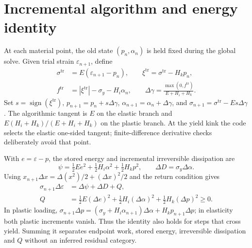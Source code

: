 \documentclass[11pt,a4paper]{article}
\begin{document}
\newpage
\section{Incremental algorithm and energy identity}
At each material point, the old state $(p_n,\alpha_n)$ is held fixed during the
global solve. Given trial strain $\varepsilon_{n+1}$, define
\begin{align}
 \sigma^{\mathrm{tr}}&=E(\varepsilon_{n+1}-p_n),\qquad
 \xi^{\mathrm{tr}}=\sigma^{\mathrm{tr}}-H_kp_n,\\
 f^{\mathrm{tr}}&=|\xi^{\mathrm{tr}}|-\sigma_y-H_i\alpha_n,\qquad
 \Delta\gamma=\frac{\max(0,f^{\mathrm{tr}})}{E+H_i+H_k}.\label{eq:return}
\end{align}
Set $s=\operatorname{sign}(\xi^{\mathrm{tr}})$, $p_{n+1}=p_n+s\Delta\gamma$,
$\alpha_{n+1}=\alpha_n+\Delta\gamma$, and
$\sigma_{n+1}=\sigma^{\mathrm{tr}}-Es\Delta\gamma$. The algorithmic tangent is $E$
on the elastic branch and $E(H_i+H_k)/(E+H_i+H_k)$ on the plastic branch. At the
yield kink the code selects the elastic one-sided tangent; finite-difference
derivative checks deliberately avoid that point.

With $e=\varepsilon-p$, the stored energy and incremental irreversible dissipation are
\begin{equation}
 \psi=\tfrac12Ee^2+\tfrac12H_i\alpha^2+\tfrac12H_kp^2,
 \qquad \Delta D=\sigma_y\Delta\alpha.\label{eq:energy}
\end{equation}
Using $x_{n+1}\Delta x=\Delta(x^2)/2+(\Delta x)^2/2$ and the return condition gives
\begin{align}
 \sigma_{n+1}\Delta\varepsilon&=\Delta\psi+\Delta D+Q,\label{eq:identity}\\
 Q&=\tfrac12 E(\Delta e)^2+\tfrac12H_i(\Delta\alpha)^2+
       \tfrac12H_k(\Delta p)^2\geq0.\label{eq:defect}
\end{align}
In plastic loading, $\sigma_{n+1}\Delta p=(\sigma_y+H_i\alpha_{n+1})\Delta\alpha+
H_kp_{n+1}\Delta p$; in elasticity both plastic increments vanish. Thus the identity
also holds for steps that cross yield. Summing it separates endpoint work, stored
energy, irreversible dissipation and $Q$ without an inferred residual category.
\end{document}
